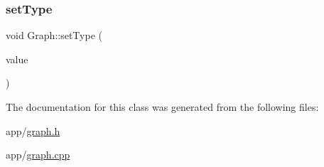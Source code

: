 \subsubsection{\texorpdfstring{set\+Type}{setType}}
{\footnotesize\ttfamily void Graph\+::set\+Type (\begin{DoxyParamCaption}\item[{const \hyperlink{class_graph_ab17f5821c439d7728a144639aa849501}{G\+R\+A\+P\+H\+I\+C\+T\+Y\+PE} \&}]{value }\end{DoxyParamCaption})\hspace{0.3cm}{\ttfamily [slot]}}



The documentation for this class was generated from the following files\+:\begin{DoxyCompactItemize}
\item 
app/\hyperlink{graph_8h}{graph.\+h}\item 
app/\hyperlink{graph_8cpp}{graph.\+cpp}\end{DoxyCompactItemize}
